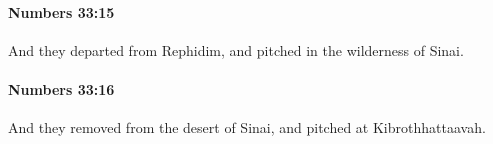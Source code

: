 		\paragraph{Numbers 33:15} %
			\label{NUMBERS-33-15}

			And they departed from Rephidim, and pitched in the wilderness of Sinai.


		\paragraph{Numbers 33:16} %
			\label{NUMBERS-33-16}

			And they removed from the desert of Sinai, and pitched at Kibrothhattaavah.


